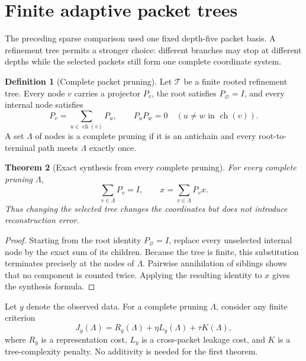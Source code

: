 \documentclass[11pt]{article}
\newtheorem{theorem}{Theorem}[section]
\theoremstyle{definition}
\newtheorem{definition}[theorem]{Definition}
\theoremstyle{remark}
\begin{document}
\section{Finite adaptive packet trees}

The preceding sparse comparison used one fixed depth-five packet basis.  A refinement tree permits a stronger choice: different branches may stop at different depths while the selected packets still form one complete coordinate system.

\begin{definition}[Complete packet pruning]
Let $\mathcal T$ be a finite rooted refinement tree.  Every node $v$ carries a projector $P_v$, the root satisfies $P_{\varnothing}=I$, and every internal node satisfies
\[
P_v=\sum_{u\in\operatorname{ch}(v)}P_u,
\qquad
P_uP_w=0\quad(u\ne w\text{ in }\operatorname{ch}(v)).
\]
A set $\Lambda$ of nodes is a complete pruning if it is an antichain and every root-to-terminal path meets $\Lambda$ exactly once.
\end{definition}

\begin{theorem}[Exact synthesis from every complete pruning]
For every complete pruning $\Lambda$,
\[
\boxed{\sum_{v\in\Lambda}P_v=I,}
\qquad
\boxed{x=\sum_{v\in\Lambda}P_vx.}
\]
Thus changing the selected tree changes the coordinates but does not introduce reconstruction error.
\end{theorem}

\begin{proof}
Starting from the root identity $P_{\varnothing}=I$, replace every unselected internal node by the exact sum of its children.  Because the tree is finite, this substitution terminates precisely at the nodes of $\Lambda$.  Pairwise annihilation of siblings shows that no component is counted twice.  Applying the resulting identity to $x$ gives the synthesis formula.
\end{proof}

Let $y$ denote the observed data.  For a complete pruning $\Lambda$, consider any finite criterion
\[
J_y(\Lambda)
=
R_y(\Lambda)
+\eta L_y(\Lambda)
+\tau K(\Lambda),
\]
where $R_y$ is a representation cost, $L_y$ is a cross-packet leakage cost, and $K$ is a tree-complexity penalty.  No additivity is needed for the first theorem.
\end{document}
